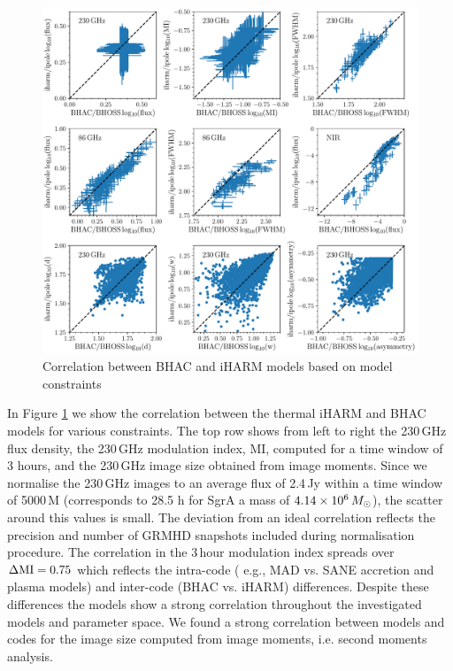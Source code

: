 \begin{figure}
  \centering
  \includegraphics[width=\columnwidth]{./figures/BHAC_iharm_correlation}
  \caption{Correlation between BHAC and iHARM models based on model constraints}
  \label{fig:modelcorrelation}
\end{figure}

In Figure \ref{fig:modelcorrelation} we show the correlation between the thermal iHARM and BHAC models for various constraints.
\newline The top row shows from left to right the 230\,GHz flux density, the 230\,GHz modulation index, MI, computed for a time window of 3 hours, and the 230\,GHz image size obtained from image moments. Since we normalise the 230\,GHz images to an average flux of 2.4\,Jy within a time window of 5000\,M (corresponds to 28.5 h for SgrA a mass of $4.14\times 10^6\,M_\odot$), the scatter around this values is small. The deviation from an ideal correlation reflects the precision and number of GRMHD snapshots included during normalisation procedure.
\newline The correlation in the 3\,hour modulation index spreads over $\Delta \rm{MI}=0.75$ which reflects the intra-code ( e.g., MAD vs. SANE accretion and plasma models) and inter-code (BHAC vs. iHARM) differences. Despite these differences the models show a strong correlation throughout the investigated models and parameter space.
\newline We found a strong correlation between models and codes for the image size computed from image moments, i.e. second moments analysis. \\

